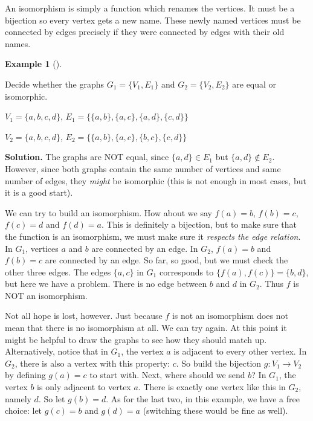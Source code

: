 \documentclass[10pt,]{book}
\theoremstyle{plain}
\theoremstyle{definition}
\newtheorem{example}[theorem]{Example}
\theoremstyle{definition}
\theoremstyle{definition}
\numberwithin{equation}{chapter}
\begin{document}
An isomorphism is simply a function which renames the vertices. It must be a bijection so every vertex gets a new name. These newly named vertices must be connected by edges precisely if they were connected by edges with their old names.
%
\begin{example}[]\label{example-102}

Decide whether the graphs \(G_1 = \{V_1, E_1\}\) and \(G_2 = \{V_2, E_2\}\) are equal or isomorphic.
%
\par

\(V_1 = \{a,b,c,d\}\), \(E_1 = \{\{a,b\}, \{a,c\}, \{a,d\}, \{c,d\}\}\)
%
\par

\(V_2 = \{a,b,c,d\}\), \(E_2 = \{\{a,b\}, \{a,c\}, \{b,c\}, \{c,d\}\}\)
%
\par\medskip\noindent%
\textbf{Solution.}\quad
The graphs are NOT equal, since \(\{a,d\} \in E_1\) but \(\{a,d\} \notin E_2\). However, since both graphs contain the same number of vertices and same number of edges, they \emph{might} be isomorphic (this is not enough in most cases, but it is a good start).
%
\par

We can try to build an isomorphism. How about we say \(f(a) = b\), \(f(b) = c\), \(f(c) = d\) and \(f(d) = a\). This is definitely a bijection, but to make sure that the function is an isomorphism, we must make sure it \emph{respects the edge relation}. In \(G_1\), vertices \(a\) and \(b\) are connected by an edge. In \(G_2\), \(f(a) = b\) and \(f(b) = c\) are connected by an edge. So far, so good, but we must check the other three edges. The edges \(\{a,c\}\) in \(G_1\) corresponds to \(\{f(a), f(c)\} = \{b,d\}\), but here we have a problem. There is no edge between \(b\) and \(d\) in \(G_2\). Thus \(f\) is NOT an isomorphism.
%
\par

Not all hope is lost, however. Just because \(f\) is not an isomorphism does not mean that there is no isomorphism at all. We can try again. At this point it might be helpful to draw the graphs to see how they should match up. Alternatively, notice that in \(G_1\), the vertex \(a\) is adjacent to every other vertex. In \(G_2\), there is also a vertex with this property: \(c\). So build the bijection \(g:V_1 \to V_2\) by defining \(g(a) = c\) to start with. Next, where should we send \(b\)? In \(G_1\), the vertex \(b\) is only adjacent to vertex \(a\). There is exactly one vertex like this in \(G_2\), namely \(d\). So let \(g(b) = d\). As for the last two, in this example, we have a free choice: let \(g(c) = b\) and \(g(d) = a\) (switching these would be fine as well).
%
\par


\end{example}
\end{document}
